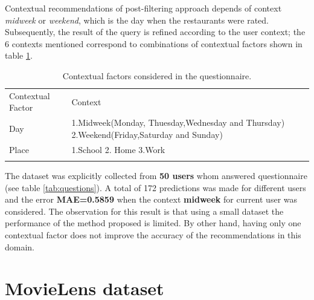 Contextual recommendations of post-filtering approach depends of
context \textit{midweek} or \textit{weekend}, which is the day when
the restaurants were rated. Subsequently, the result of the query is
refined according to the user context; the 6 contexts mentioned
correspond to combinations of contextual factors shown in table
\ref{tab:contextstijuana}.
\begin{table}
\small
\caption{Contextual factors considered in the questionnaire.}
\label{tab:contextstijuana} 
\centering
\small
\begin{tabular}{p{2.5cm} p{7cm} }
\hline\noalign{\smallskip}
Contextual Factor & Context \\
\noalign{\smallskip}\hline\noalign{\smallskip}
\small{Day} & \small{1.Midweek(Monday, Thuesday,Wednesday and Thursday) 
2.Weekend(Friday,Saturday and Sunday)}  \\ \hline 
\small{Place} & \small{1.School 2. Home 3.Work} \\ 
\noalign{\smallskip}\hline
\end{tabular}
\end{table}
The dataset was explicitly collected from \textbf{50 users} whom
answered questionnaire (see table \ref{tab:questions}). A total of 172
predictions was made for different users and the error
\textbf{MAE=0.5859} when the context \textbf{midweek} for current user
was considered. The observation for this result is that using a small
dataset the performance of the method proposed is limited. By other
hand, having only one contextual factor does not improve the accuracy
of the recommendations in this domain.

\section{MovieLens dataset} 

